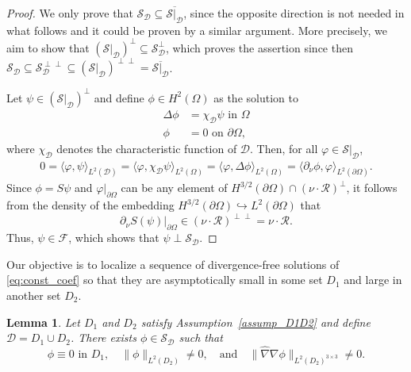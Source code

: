 \documentclass[reqno]{amsart}
\numberwithin{equation}{section}
\numberwithin{figure}{section}
\numberwithin{table}{section}
\newcommand{\norm}[1]{\lVert#1\rVert}
\newcommand{\inner}[1]{\langle#1\rangle}
\newcommand{\D}{\mathcal{D}}
\theoremstyle{definition}
\theoremstyle{plain}
\newtheorem{lem}[thm]{Lemma}
\theoremstyle{definition}
\theoremstyle{remark}
\numberwithin{equation}{section}
\begin{document}
\begin{proof}
	We only prove that $\mathcal{S}_{\D} \subseteq \overline{\mathcal{S}|_{\D}}$, since the opposite direction is not needed in what follows and it could be proven by a similar argument. More precisely, we aim to show that $(\mathcal{S}|_{\D})^{\perp} \subseteq \mathcal{S}_{\D}^\perp$, which proves the assertion since then $\mathcal{S}_{\D} \subseteq \mathcal{S}_{\D}^{\perp \perp} \subseteq (\mathcal{S}|_{\D})^{\perp \perp} = \overline{ \mathcal{S}|_{\D}}$.
	
	Let $\psi \in (\mathcal{S}|_{\D})^\perp$ and define $\phi \in H^2(\Omega)$ as the solution to
	\begin{align*} 
		\Delta\phi &= \chi_{\D} \psi \text{ in } \Omega\\
		\phi &= 0 \text{ on } \partial\Omega,
	\end{align*}
	where $\chi_{\D}$ denotes the characteristic function of $\D$. Then, for all $\varphi \in \mathcal{S}|_{\D}$,
	\begin{align*}
		0 = \inner{\varphi,\psi}_{L^2(\D)} = \inner{\varphi,\chi_{\D} \psi}_{L^2(\Omega)} = \inner{\varphi,\Delta \phi}_{L^2(\Omega)} = \inner{\partial_\nu \phi, \varphi}_{L^2(\partial\Omega)}.
	\end{align*}
	Since $\phi = S\psi$ and  $\varphi|_{\partial\Omega}$ can be any element of $H^{3/2}(\partial \Omega) \cap (\nu \cdot \mathcal{R})^\perp$, it follows from the density of the embedding $H^{3/2}(\partial \Omega) \hookrightarrow L^2(\partial \Omega)$ that 
	\begin{equation*}
		\partial_\nu S(\psi)|_{\partial\Omega} \in (\nu \cdot \mathcal{R})^{\perp \perp} = \nu \cdot \mathcal{R}.
	\end{equation*}
	Thus, $\psi \in \mathcal F$, which shows that $\psi \perp \mathcal{S}_{\D}$.
\end{proof}

Our objective is to localize a sequence of divergence-free solutions of \eqref{eq:const_coef} so that they are asymptotically small in some set $D_1$ and large in another set $D_2$. 

\begin{lem} \label{lem_blowupCand}
	Let $D_1$ and $D_2$ satisfy Assumption~\ref{assump_D1D2} and define $\D = D_1 \cup D_2$. There exists $\phi \in \mathcal{S}_{\D}$ such that 
	\begin{equation*}
		\phi \equiv 0 \text{ in } D_1, \quad \norm{\phi}_{ L^2(D_2)} \neq 0, \quad\text{and}\quad \norm{\widehat{\nabla} \nabla \phi}_{L^2(D_2)^{3\times3}} \neq 0. 
	\end{equation*}
\end{lem}
\end{document}
